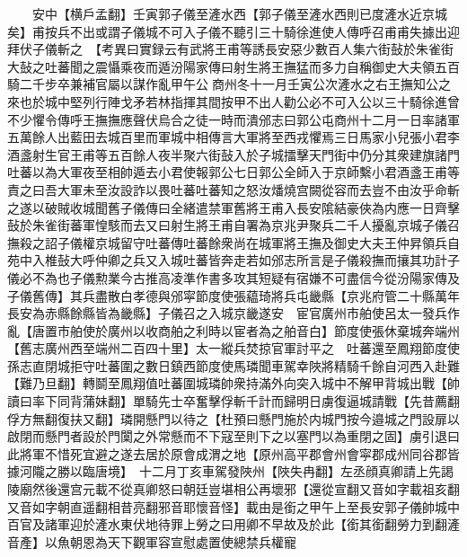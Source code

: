 　　安中【横戶孟翻】壬寅郭子儀至滻水西【郭子儀至滻水西則已度滻水近京城矣】甫按兵不出或謂子儀城不可入子儀不聽引三十騎徐進使人傳呼召甫甫失據出迎拜伏子儀斬之　【考異曰實録云有武將王甫等誘長安惡少數百人集六街鼔於朱雀街大鼔之吐蕃聞之震懾乘夜而遁汾陽家傳曰射生將王撫猛而多力自稱御史大夫領五百騎二千步卒兼補官屬以謀作亂甲午公商州冬十一月壬寅公次滻水之右王撫知公之來也於城中堅列行陣戈矛若林指揮其間按甲不出人勸公必不可入公以三十騎徐進曾不少懼令傳呼王撫撫應聲伏烏合之徒一時而潰邠志曰郭公屯商州十二月一日率諸軍五萬餘人出藍田去城百里而軍城中相傳言大軍將至西戎懼焉三日馬家小兒張小君李酒盞射生官王甫等五百餘人夜半聚六街鼔入於子城擂擊天門街中仍分其衆建旗諸門吐蕃以為大軍夜至相帥遁去小君使報郭公七日郭公全師入于京師繫小君酒盞王甫等責之曰吾大軍未至汝設詐以畏吐蕃吐蕃知之怒汝燔燒宫闕從容而去豈不由汝乎命斬之遂以破賊收城聞舊子儀傳曰全緒遣禁軍舊將王甫入長安隂結豪俠為内應一日齊擊鼔於朱雀街蕃軍惶駭而去又曰射生將王甫自署為京兆尹聚兵二千人擾亂京城子儀召撫殺之詔子儀權京城留守吐蕃傳吐蕃餘衆尚在城軍將王撫及御史大夫王仲昇領兵自苑中入椎鼔大呼仲卿之兵又入城吐蕃皆奔走若如邠志所言是子儀殺撫而攘其功計子儀必不為也子儀勲業今古推高凌準作書多攻其短疑有宿嫌不可盡信今從汾陽家傳及子儀舊傳】其兵盡散白孝德與邠寜節度使張藴琦將兵屯畿縣【京兆府管二十縣萬年長安為赤縣餘縣皆為畿縣】子儀召之入城京畿遂安　宦官廣州市舶使呂太一發兵作亂【唐置市舶使於廣州以收商舶之利時以宦者為之舶音白】節度使張休棄城奔端州【舊志廣州西至端州二百四十里】太一縱兵焚掠官軍討平之　吐蕃還至鳳翔節度使孫志直閉城拒守吐蕃圍之數日鎮西節度使馬璘聞車駕幸陜將精騎千餘自河西入赴難【難乃旦翻】轉鬬至鳳翔值吐蕃圍城璘帥衆持滿外向突入城中不解甲背城出戰【帥讀曰率下同背蒲妹翻】單騎先士卒奮擊俘斬千計而歸明日虜復逼城請戰【先昔薦翻俘方無翻復扶又翻】璘開懸門以待之【杜預曰懸門施於内城門按今邉城之門設扉以啟閉而懸門者設於門闑之外常懸而不下寇至則下之以塞門以為重閉之固】虜引退曰此將軍不惜死宜避之遂去居於原會成渭之地【原州高平郡會州會寜郡成州同谷郡皆據河隴之勝以臨唐境】　十二月丁亥車駕發陜州【陜失冉翻】左丞顔真卿請上先謁陵廟然後還宫元載不從真卿怒曰朝廷豈堪相公再壞邪【還從宣翻又音如字載祖亥翻又音如字朝直遥翻相昔亮翻邪音耶懷音怪】載由是銜之甲午上至長安郭子儀帥城中百官及諸軍迎於滻水東伏地待罪上勞之曰用卿不早故及於此【銜其銜翻勞力到翻滻音產】以魚朝恩為天下觀軍容宣慰處置使總禁兵權寵


